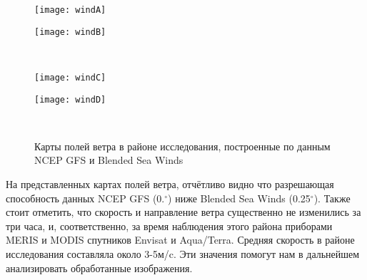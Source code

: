 \begin{figure}[H]
   	\centering
	\begin{minipage}{.47\textwidth}
	    \subcaptionbox{\label{fig:windA}}
		{\texttt{[image: windA]}}
	\end{minipage}
	\hfill
	\begin{minipage}{.47\textwidth}
	    \subcaptionbox{\label{fig:windB}}
		{\texttt{[image: windB]}}
	\end{minipage}
	\\
	\begin{minipage}{.47\textwidth}
	    \subcaptionbox{\label{fig:windC}}
		{\texttt{[image: windC]}}
	\end{minipage}
	\hfill
	\begin{minipage}{.47\textwidth}
	    \subcaptionbox{\label{fig:windD}}
		{\texttt{[image: windD]}}
	\end{minipage}
    \\
    \caption{Карты полей ветра в районе исследования, построенные по данным NCEP GFS и Blended Sea Winds}
    \label{fig:wind}
\end{figure}

На представленных картах полей ветра, отчётливо видно что разрешающая способность данных NCEP GFS (0.${}^\circ$) ниже Blended Sea Winds (0.25${}^\circ$). Также стоит отметить, что скорость и направление ветра существенно не изменились за три часа, и, соответственно, за время наблюдения этого района приборами MERIS и MODIS спутников Envisat и Aqua/Terra. Средняя скорость в районе исследования составляла около 3-5м/c. Эти значения помогут нам в дальнейшем анализировать обработанные изображения.


